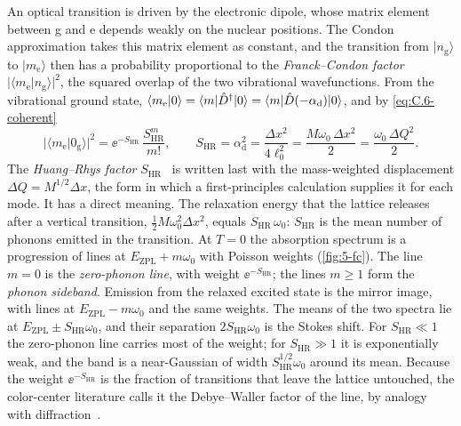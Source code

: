 An optical transition is driven by the electronic dipole, whose matrix element between g and e depends weakly on the nuclear positions. The Condon approximation takes this matrix element as constant, and the transition from $|n_{\mathrm{g}}\rangle$ to $|m_{\mathrm{e}}\rangle$ then has a probability proportional to the \emph{Franck--Condon factor} $|\langle m_{\mathrm{e}}|n_{\mathrm{g}}\rangle|^2$, the squared overlap of the two vibrational wavefunctions. From the vibrational ground state, $\langle m_{\mathrm{e}}|0\rangle = \langle m|\hat{D}^\dagger|0\rangle = \langle m|\hat{D}(-\alpha_{\mathrm{d}})|0\rangle$, and by \cref{eq:C.6-coherent}
\begin{equation}
  |\langle m_{\mathrm{e}}|0_{\mathrm{g}}\rangle|^2 = \ee^{-S_{\mathrm{HR}}}\,\frac{S_{\mathrm{HR}}^m}{m!} , \qquad
  S_{\mathrm{HR}} = \alpha_{\mathrm{d}}^2 = \frac{\Delta x^2}{4\ell_0^2} = \frac{M\omega_0\,\Delta x^2}{2} = \frac{\omega_0\,\Delta Q^2}{2} .
  \label{eq:5.6-FC}
\end{equation}
The \emph{Huang--Rhys factor} $S_{\mathrm{HR}}$~\cite{huang1950theory} is written last with the mass-weighted displacement $\Delta Q = M^{1/2}\Delta x$, the form in which a first-principles calculation supplies it for each mode. It has a direct meaning. The relaxation energy that the lattice releases after a vertical transition, $\tfrac12M\omega_0^2\Delta x^2$, equals $S_{\mathrm{HR}}\,\omega_0$: $S_{\mathrm{HR}}$ is the mean number of phonons emitted in the transition. At $T = 0$ the absorption spectrum is a progression of lines at $E_{\mathrm{ZPL}} + m\omega_0$ with Poisson weights (\cref{fig:5-fc}). The line $m = 0$ is the \emph{zero-phonon line}, with weight $\ee^{-S_{\mathrm{HR}}}$; the lines $m \ge 1$ form the \emph{phonon sideband}. Emission from the relaxed excited state is the mirror image, with lines at $E_{\mathrm{ZPL}} - m\omega_0$ and the same weights. The means of the two spectra lie at $E_{\mathrm{ZPL}} \pm S_{\mathrm{HR}}\omega_0$, and their separation $2S_{\mathrm{HR}}\omega_0$ is the Stokes shift. For $S_{\mathrm{HR}} \ll 1$ the zero-phonon line carries most of the weight; for $S_{\mathrm{HR}} \gg 1$ it is exponentially weak, and the band is a near-Gaussian of width $S_{\mathrm{HR}}^{1/2}\omega_0$ around its mean. Because the weight $\ee^{-S_{\mathrm{HR}}}$ is the fraction of transitions that leave the lattice untouched, the color-center literature calls it the Debye--Waller factor of the line, by analogy with diffraction~\cite[Sect.~2.2]{alkauskas2014first}.

